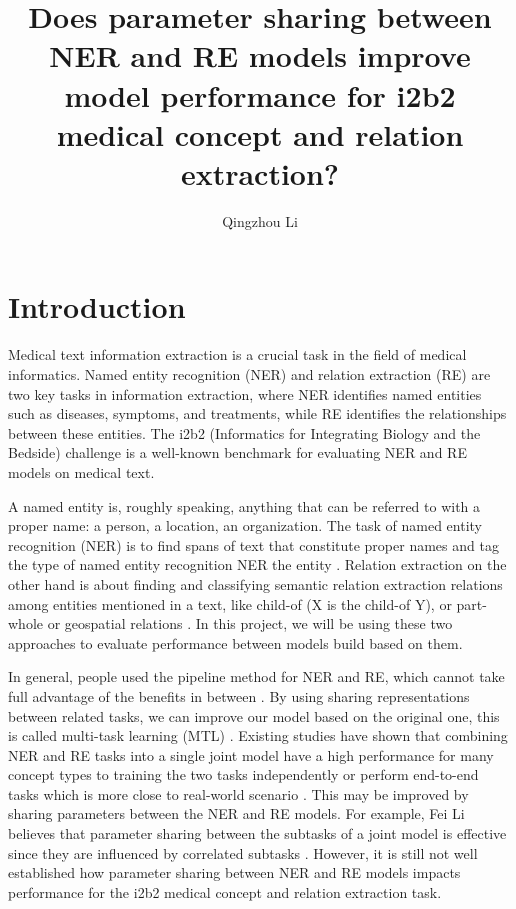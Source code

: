 \documentclass{article}
\title{\textbf{Does parameter sharing between NER and RE models improve model performance for i2b2 medical concept and relation extraction?}}
\author{Qingzhou Li}
\begin{document}
\maketitle


\section{Introduction}

Medical text information extraction is a crucial task in the field of medical informatics. Named entity recognition (NER) and relation extraction (RE) are two key tasks in information extraction, where NER identifies named entities such as diseases, symptoms, and treatments, while RE identifies the relationships between these entities. The i2b2 (Informatics for Integrating Biology and the Bedside) challenge is a well-known benchmark for evaluating NER and RE models on medical text. 

A named entity is, roughly speaking, anything that can be referred to with a proper name: a person, a location, an organization. The task of named entity recognition (NER) is to find spans of text that constitute proper names and tag the type of named entity recognition NER the entity \cite{Daniel2}. Relation extraction on the other hand is about finding and classifying semantic relation extraction relations among entities mentioned in a text, like child-of (X is the child-of Y), or part-whole or geospatial relations \cite{Daniel}. In this project, we will be using these two approaches to evaluate performance between models build based on them.

In general, people used the pipeline method for NER and RE, which cannot take full advantage of the benefits in between \cite{10.1007/978-981-16-8885-0_29}. By using sharing representations between related tasks, we can improve our model based on the original one, this is called multi-task learning (MTL) \cite{ruder}. Existing studies have shown that combining NER and RE tasks into a single joint model have a high performance for many concept types to training the two tasks independently or perform end-to-end tasks which is more close to real-world scenario \cite{10.1093/jamia/ocz166}. This may be improved by sharing parameters between the NER and RE models. For example, Fei Li believes that parameter sharing between the subtasks of a joint model is effective since they are influenced by correlated subtasks \cite{li_zhang_fu_ji_2017}. However, it is still not well established how parameter sharing between NER and RE models impacts performance for the i2b2 medical concept and relation extraction task.
\end{document}
